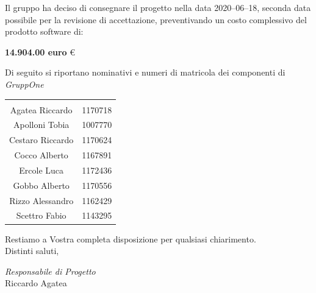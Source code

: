 \documentclass{article}
\begin{document}
Il gruppo ha deciso di consegnare il progetto nella data 2020--06--18, seconda data possibile per la revisione di accettazione, preventivando un costo complessivo del prodotto software di:
\begin{center}
  \textbf{14.904.00 euro} €
\end{center}
\newpage
Di seguito si riportano nominativi e numeri di matricola dei componenti di \textit{GruppOne}
\begin{table}[H]%
  \label{tab:componenti}
  \centering
  \begin{tabular}[c]{c c}
    \rowcolor{darkgray!90!}\color{white}{\textbf{Nominativo}} & \color{white}{\textbf{Matricola}} \\
    Agatea Riccardo                                           & 1170718                           \\
    Apolloni Tobia                                            & 1007770                           \\
    Cestaro Riccardo                                          & 1170624                           \\
    Cocco Alberto                                             & 1167891                           \\
    Ercole Luca                                               & 1172436                           \\
    Gobbo Alberto                                             & 1170556                           \\
    Rizzo Alessandro                                          & 1162429                           \\
    Scettro Fabio                                             & 1143295                           \\
  \end{tabular}
\end{table}
Restiamo a Vostra completa disposizione per qualsiasi chiarimento.\\
Distinti saluti,

\hspace{2cm}
\begin{adjustwidth}{2.5cm}{10.5cm}
  \centering
  \textit{Responsabile di Progetto}\\
  Riccardo Agatea\\
  \hspace{2cm}
  \underline{} %
\end{adjustwidth}
\end{document}
